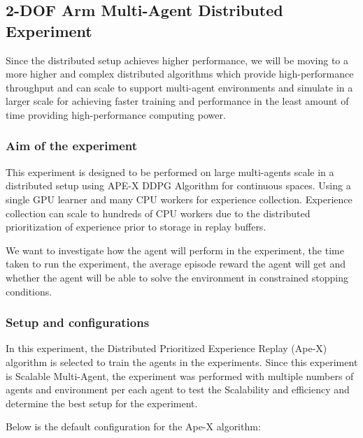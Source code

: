 
\subsection{2-DOF Arm Multi-Agent Distributed Experiment}

Since the distributed setup achieves higher performance, we will be moving to a more higher and complex distributed algorithms which provide high-performance throughput and can scale to support multi-agent environments and simulate in a larger scale for achieving faster training and performance in the least amount of time providing high-performance computing power.

\subsubsection{Aim of the experiment}

This experiment is designed to be performed on large multi-agents scale in a distributed setup using APE-X DDPG Algorithm for continuous spaces. Using a single GPU learner and many CPU workers for experience collection. Experience collection can scale to hundreds of CPU workers due to the distributed prioritization of experience prior to storage in replay buffers.

We want to investigate how the agent will perform in the experiment, the time taken to run the experiment, the average episode reward the agent will get and whether the agent will be able to solve the environment in constrained stopping conditions.

\subsubsection{Setup and configurations}

In this experiment, the Distributed Prioritized Experience Replay (Ape-X) algorithm is selected to train the agents in the experiments. Since this experiment is Scalable Multi-Agent, the experiment was performed with multiple numbers of agents and environment per each agent to test the Scalability and efficiency and determine the best setup for the experiment.

Below is the default configuration for the Ape-X algorithm:



